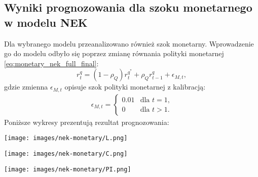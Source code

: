 \subsection{Wyniki prognozowania dla szoku monetarnego w modelu NEK}
\label{sec:results_nek_mon}

Dla wybranego modelu przeanalizowano również szok monetarny. Wprowadzenie go do modelu odbyło się poprzez zmianę równania polityki monetarnej \eqref{eq:monetary_nek_full_final}:
\begin{equation}
    r^q_t = (1-\rho_Q)r^{q^*}_t + \rho_Q r^q_{t-1} + \epsilon_{M,t},
\end{equation}
gdzie zmienna $\epsilon_{M,t}$ opisuje szok polityki monetarnej z kalibracją:
\begin{gather}
        \epsilon_{M,t} =
        \begin{cases}
            0.01 & \text{dla $t = 1$,} \\
            0 & \text{dla $t > 1$.}
        \end{cases}
\end{gather}
Poniższe wykresy prezentują rezultat prognozowania:
\begin{center}
    \begin{minipage}{.3\textwidth}
      \centering
      \captionsetup{type=figure}
      \texttt{[image: images/nek-monetary/L.png]}
      \label{fig:nek-monetary:L}
    \end{minipage}%
    \begin{minipage}{.3\textwidth}
      \centering
      \captionsetup{type=figure}
      \texttt{[image: images/nek-monetary/C.png]}
      \label{fig:nek-monetary:C}
    \end{minipage}
    \begin{minipage}{.3\textwidth}
      \centering
      \captionsetup{type=figure}
      \texttt{[image: images/nek-monetary/PI.png]}
      \label{fig:nek-monetary:PI}
    \end{minipage}
\end{center}

